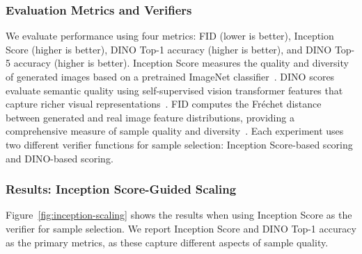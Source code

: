 \documentclass{article}
\begin{document}
\subsubsection{Evaluation Metrics and Verifiers}

We evaluate performance using four metrics: FID (lower is better), Inception Score (higher is better), DINO Top-1 accuracy (higher is better), and DINO Top-5 accuracy (higher is better). Inception Score measures the quality and diversity of generated images based on a pretrained ImageNet classifier~\cite{salimans2016improved}. DINO scores evaluate semantic quality using self-supervised vision transformer features that capture richer visual representations~\cite{caron2021emerging}. FID computes the Fréchet distance between generated and real image feature distributions, providing a comprehensive measure of sample quality and diversity~\cite{heusel2017gans}. Each experiment uses two different verifier functions for sample selection: Inception Score-based scoring and DINO-based scoring.

\subsubsection{Results: Inception Score-Guided Scaling}

Figure~\ref{fig:inception-scaling} shows the results when using Inception Score as the verifier for sample selection. We report Inception Score and DINO Top-1 accuracy as the primary metrics, as these capture different aspects of sample quality.
\end{document}
